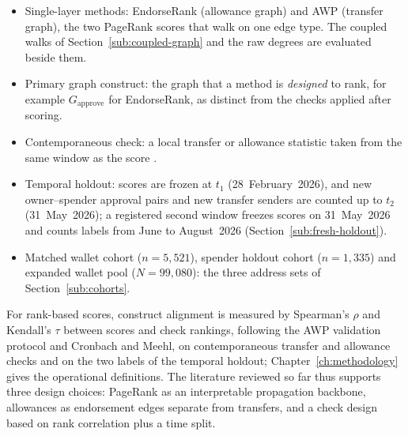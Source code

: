 \begin{itemize}
\item Single-layer methods: EndorseRank (allowance graph) and AWP (transfer graph), the two PageRank scores that walk on one edge type. The coupled walks of Section~\ref{sub:coupled-graph} and the raw degrees are evaluated beside them.
\item Primary graph construct: the graph that a method is \emph{designed} to rank, for example $G_{\text{approve}}$ for EndorseRank, as distinct from the checks applied after scoring.
\item Contemporaneous check: a local transfer or allowance statistic taken from the same window as the score .
\item Temporal holdout: scores are frozen at $t_1$ (28~February~2026), and new owner--spender approval pairs and new transfer senders are counted up to $t_2$ (31~May~2026); a registered second window freezes scores on 31~May~2026 and counts labels from June to August~2026 (Section~\ref{sub:fresh-holdout}).
\item Matched wallet cohort ($n=5{,}521$), spender holdout cohort ($n=1{,}335$) and expanded wallet pool ($N=99{,}080$): the three address sets of Section~\ref{sub:cohorts}.
\end{itemize}


For rank-based scores, construct alignment is measured by Spearman's $\rho$ and Kendall's $\tau$ between scores and check rankings, following the AWP validation protocol and Cronbach and Meehl, on contemporaneous transfer and allowance checks and on the two labels of the temporal holdout; Chapter~\ref{ch:methodology} gives the operational definitions. The literature reviewed so far thus supports three design choices: PageRank as an interpretable propagation backbone, allowances as endorsement edges separate from transfers, and a check design based on rank correlation plus a time split.


